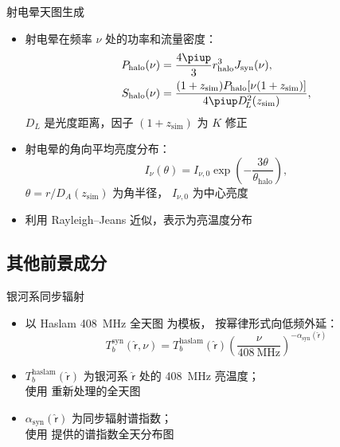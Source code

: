 \documentclass{beamer}
\newcommand{\R}[1]{\text{#1}}  %
\newcommand{\Cpi}{\piup}  %
\newcommand{\B}[1]{\bm{\mathsf{#1}}}  %
\newcommand{\citeay}[1]{\citeauthor{#1} \citeyear{#1} \parencite{#1}}
\begin{document}
\begin{frame}{射电晕天图生成}
  \begin{itemize}
    \item 射电晕在频率 $\nu$ 处的功率和流量密度：
      \begin{align}
        P_{\R{halo}}(\nu)
          & = \frac{4\Cpi}{3} r^3_{\R{halo}} J_{\R{syn}}(\nu) , \\
        S_{\R{halo}}(\nu)
          & = \frac{(1+z_{\R{sim}}) P_{\R{halo}}[\nu (1+z_{\R{sim}})]}{
            4\Cpi D^2_{\!L}(z_{\R{sim}})} ,
      \end{align}
      $D_{\!L}$ 是光度距离，因子 $(1+z_{\R{sim}})$ 为 $K$ 修正
    \item 射电晕的角向平均亮度分布：
      \begin{equation}
        I_{\nu}(\theta) = I_{\nu,0} \exp
          \left( -\frac{3\theta}{\theta_{\R{halo}}} \right) ,
      \end{equation}
      $\theta = r / D_{\!A}(z_{\R{sim}})$ 为角半径，
      $I_{\nu,0}$ 为中心亮度
    \item 利用 Rayleigh--Jeans 近似，表示为亮温度分布
  \end{itemize}
\end{frame}

\subsection{其他前景成分}

\begin{frame}{银河系同步辐射}
  \begin{itemize}
    \item 以 Haslam \SI{408}{\MHz} 全天图\cite{haslam1982} 为模板，
      按幂律形式向低频外延：
      \begin{equation}
        T_b^{\R{syn}}(\hat{\B{r}}, \nu)
          = T_b^{\R{haslam}}(\hat{\B{r}})
            \left( \frac{\nu}{\SI{408}{\MHz}}
            \right)^{-\alpha_{\R{syn}}(\hat{\B{r}})}
      \end{equation}
    \item $T_b^{\R{haslam}}(\hat{\B{r}})$
      为银河系 $\hat{\B{r}}$ 处的 \SI{408}{\MHz} 亮温度；\\
      使用 \citeay{remazeilles2015} 重新处理的全天图
    \item $\alpha_{\R{syn}}(\hat{\B{r}})$ 为同步辐射谱指数；\\
      使用 \citeay{giardino2002} 提供的谱指数全天分布图
  \end{itemize}
\end{frame}
\end{document}
